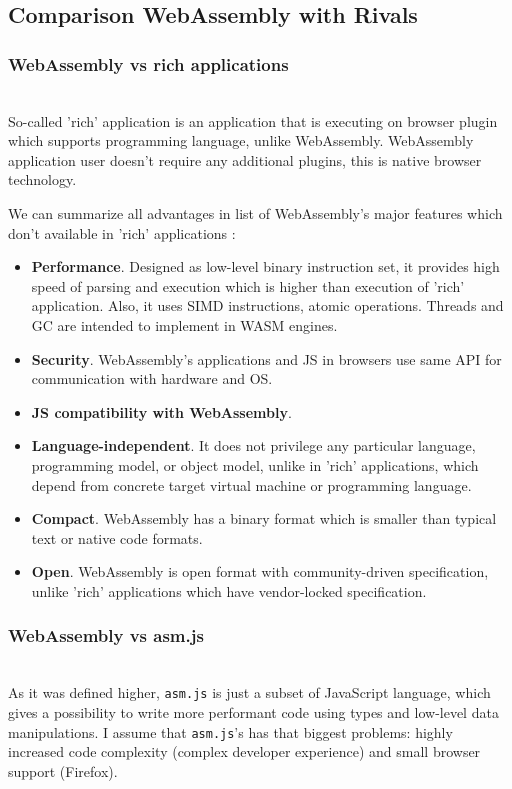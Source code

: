 \subsection{Comparison WebAssembly with Rivals}
\subsubsection{WebAssembly vs rich applications}\mbox{}\\
So-called 'rich' application is an application that is executing on browser plugin which supports programming language, unlike WebAssembly.
WebAssembly application user doesn't require any additional plugins, this is native browser technology.

We can summarize all advantages in list of WebAssembly's major features which don't available in 'rich' applications :
\begin{itemize}  
  \item \textbf{Performance}. Designed as low-level binary instruction set, it provides high speed of parsing and execution which is higher than execution of 'rich' application. 
                Also, it uses SIMD instructions, atomic operations. Threads and GC are intended to implement in WASM engines. 
  \item \textbf{Security}. WebAssembly’s applications and JS in browsers use same API for communication with hardware and OS.
  \item \textbf{JS compatibility with WebAssembly}.
  \item \textbf{Language-independent}. It does not privilege any particular language, programming model, or object model, unlike in 'rich' applications, 
                which depend from concrete target virtual machine or programming language.
  \item \textbf{Compact}. WebAssembly has a binary format which is smaller than typical text or native code formats.
  \item \textbf{Open}. WebAssembly is open format with community-driven specification, unlike 'rich' applications which have vendor-locked specification.

\end{itemize}

\subsubsection{WebAssembly vs asm.js}\mbox{}\\
\indent As it was defined higher, \texttt{asm.js} is just a subset of JavaScript language, which gives a possibility to write more performant code using types and low-level data manipulations.
I assume that \texttt{asm.js}'s has that biggest problems: highly increased code complexity (complex developer experience) and small browser support (Firefox).

